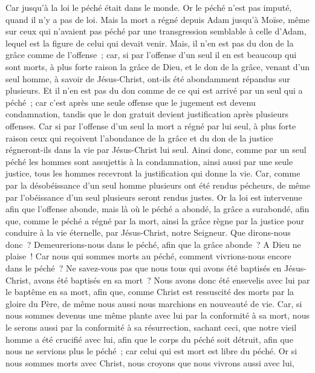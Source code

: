 \begin{multicols}{2}
Car jusqu'à la loi le péché était dans le monde. Or le péché n'est pas imputé, quand il n'y a pas de loi.
Mais la mort a régné depuis Adam jusqu'à Moïse, même sur ceux qui n'avaient pas péché par une transgression semblable à celle d'Adam, lequel est la figure de celui qui devait venir.
Mais, il n'en est pas du don de la grâce comme de l'offense~; car, si par l'offense d'un seul il en est beaucoup qui sont morts, à plus forte raison la grâce de Dieu, et le don de la grâce, venant d'un seul homme, à savoir de Jésus-Christ, ont-ils été abondamment répandus sur plusieurs.
Et il n'en est pas du don comme de ce qui est arrivé par un seul qui a péché~; car c'est après une seule offense que le jugement est devenu condamnation, tandis que le don gratuit devient justification après plusieurs offenses.
Car si par l'offense d'un seul la mort a régné par lui seul, à plus forte raison ceux qui reçoivent l'abondance de la grâce et du don de la justice régneront-ils dans la vie par Jésus-Christ lui seul.
Ainsi donc, comme par un seul péché les hommes sont assujettis à la condamnation, ainsi aussi par une seule justice, tous les hommes recevront la justification qui donne la vie.
Car, comme par la désobéissance d'un seul homme plusieurs ont été rendus pécheurs, de même par l'obéissance d'un seul plusieurs seront rendus justes.
Or la loi est intervenue afin que l'offense abonde, mais là où le péché a abondé, la grâce a surabondé,
afin que, comme le péché a régné par la mort, ainsi la grâce règne par la justice pour conduire à la vie éternelle, par Jésus-Christ, notre Seigneur.
\VerseOne{}Que dirons-nous donc~? Demeurerions-nous dans le péché, afin que la grâce abonde~?
A Dieu ne plaise~! Car nous qui sommes morts au péché, comment vivrions-nous encore dans le péché~?
Ne savez-vous pas que nous tous qui avons été baptisés en Jésus-Christ, avons été baptisés en sa mort~?
Nous avons donc été ensevelis avec lui par le baptême en sa mort, afin que, comme Christ est ressuscité des morts par la gloire du Père, de même nous aussi nous marchions en nouveauté de vie.
Car, si nous sommes devenus une même plante avec lui par la conformité à sa mort, nous le serons aussi par la conformité à sa résurrection,
sachant ceci, que notre vieil homme a été crucifié avec lui, afin que le corps du péché soit détruit, afin que nous ne servions plus le péché~;
car celui qui est mort est libre du péché.
Or si nous sommes morts avec Christ, nous croyons que nous vivrons aussi avec lui,

\end{multicols}
